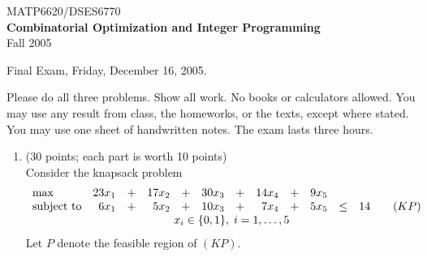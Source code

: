 \documentclass[12pt]{article}
\begin{document}
\begin{center}
  {\large
  MATP6620/DSES6770 \\
  {\bf Combinatorial Optimization and Integer Programming } \\
  Fall 2005}
\end{center}

\begin{center}
  Final Exam, Friday, December 16, 2005.
\end{center}

Please do all three problems. Show all work. No books or calculators allowed.
You may use any result from class, the homeworks, or the texts, except where
stated.
You may use one sheet of handwritten notes.
The exam lasts three hours.

\begin{enumerate}
%
%
%


   \item (30 points; each part is worth 10 points) \\
Consider the knapsack problem
\begin{displaymath}
\begin{array}{lrcrcrcrcrclr}
\max & 23x_1 & + & 17x_2 & + & 30x_3 & + & 14x_4 & + & 9x_5 \\
\mbox{subject to} & 6x_1 & + & 5x_2 & + & 10x_3 & + & 7x_4 & + & 5x_5 & \leq & 14 & \quad (KP) \\
& \multicolumn{11}{c}{x_i \in \{0,1\},  \; i=1,\ldots, 5}
\end{array}
\end{displaymath}
Let $P$ denote the feasible region of $(KP)$.


\end{enumerate}
\end{document}
